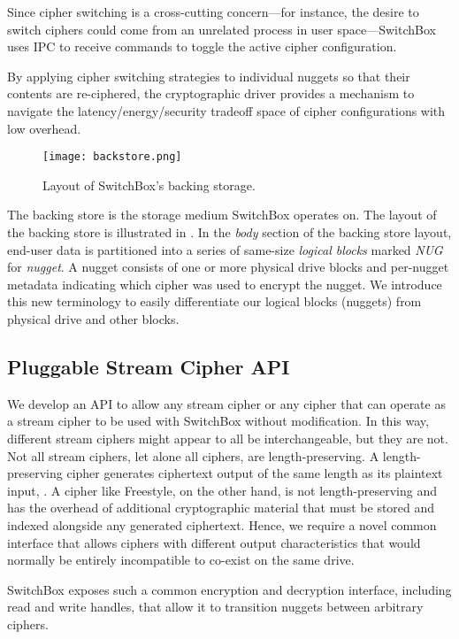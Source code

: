Since cipher switching is a cross-cutting concern---for instance, the desire to
switch ciphers could come from an unrelated process in user space---SwitchBox
uses IPC to receive commands to toggle the active cipher configuration.

By applying cipher switching strategies to individual nuggets so that their
contents are re-ciphered, the cryptographic driver provides a mechanism to
navigate the latency/energy/security tradeoff space of cipher configurations
with low overhead.

\begin{figure}[t]
\centering
\texttt{[image: backstore.png]}
 \caption{Layout of SwitchBox's backing storage.}\label{fig:backstore2}
\end{figure}

The backing store is the storage medium SwitchBox operates on. The layout of the
backing store is illustrated in . In the \textit{body}
section of the backing store layout, end-user data is partitioned into a series
of same-size \emph{logical blocks} marked \textit{NUG} for \emph{nugget}. A
nugget consists of one or more physical drive blocks and per-nugget metadata
indicating which cipher was used to encrypt the nugget. We introduce this new
terminology to easily differentiate our logical blocks (nuggets) from physical
drive and other blocks.

\subsection{Pluggable Stream Cipher API}

We develop an API to allow any stream cipher or any cipher that can operate as a
stream cipher to be used with SwitchBox without modification. In this way,
different stream ciphers might appear to all be interchangeable, but they are
not. Not all stream ciphers, let alone all ciphers, are length-preserving. A
length-preserving cipher generates ciphertext output of the same length as its
plaintext input, . A cipher like Freestyle, on the other hand, is
not length-preserving and has the overhead of additional cryptographic material
that must be stored and indexed alongside any generated ciphertext. Hence, we
require a novel common interface that allows ciphers with different output
characteristics that would normally be entirely incompatible to co-exist on the
same drive.

SwitchBox exposes such a common encryption and decryption interface, including
read and write handles, that allow it to transition nuggets between arbitrary
ciphers.

